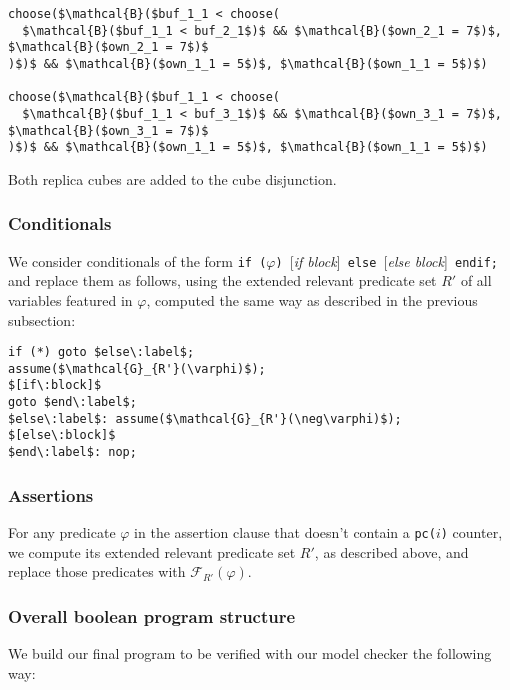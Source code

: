 \begin{lstlisting}[frame=single, mathescape]
choose($\mathcal{B}($buf_1_1 < choose(
  $\mathcal{B}($buf_1_1 < buf_2_1$)$ && $\mathcal{B}($own_2_1 = 7$)$, $\mathcal{B}($own_2_1 = 7$)$
)$)$ && $\mathcal{B}($own_1_1 = 5$)$, $\mathcal{B}($own_1_1 = 5$)$)

choose($\mathcal{B}($buf_1_1 < choose(
  $\mathcal{B}($buf_1_1 < buf_3_1$)$ && $\mathcal{B}($own_3_1 = 7$)$, $\mathcal{B}($own_3_1 = 7$)$
)$)$ && $\mathcal{B}($own_1_1 = 5$)$, $\mathcal{B}($own_1_1 = 5$)$)
\end{lstlisting}

Both replica cubes are added to the cube disjunction.

\subsubsection{Conditionals}

We consider conditionals of the form \lstinline$if ($$\varphi$\lstinline$) $[\textit{if block}]\lstinline$ else $[\textit{else block}]\lstinline$ endif;$ and replace them as follows, using the extended relevant predicate set $R'$ of all variables featured in $\varphi$, computed the same way as described in the previous subsection:

\begin{lstlisting}[frame=single, mathescape]
if (*) goto $else\:label$;
assume($\mathcal{G}_{R'}(\varphi)$);
$[if\:block]$
goto $end\:label$;
$else\:label$: assume($\mathcal{G}_{R'}(\neg\varphi)$);
$[else\:block]$
$end\:label$: nop;
\end{lstlisting}

\subsubsection{Assertions}

For any predicate $\varphi$ in the assertion clause that doesn't contain a \lstinline$pc($$i$\lstinline$)$ counter, we compute its extended relevant predicate set $R'$, as described above, and replace those predicates with $\mathcal{F}_{R'}(\varphi)$.

\pagebreak

\subsubsection{Overall boolean program structure}

We build our final program to be verified with our model checker the following way:

